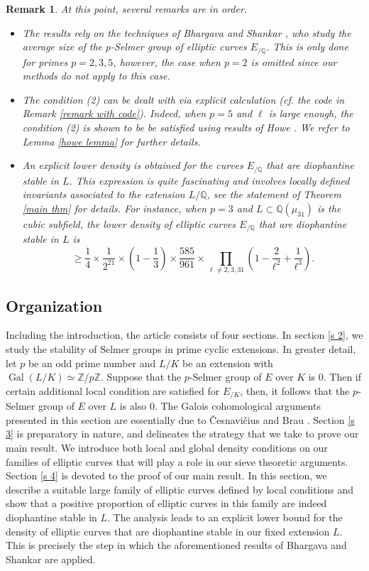 \documentclass[12pt]{amsart}
\newtheorem{remark}[theorem]{Remark}
\newcommand{\Z}{\mathbb{Z}}
\newcommand{\Q}{\mathbb{Q}}
\newcommand{\op}[1]{\operatorname{#1}}
\numberwithin{equation}{section}
\begin{document}
\begin{remark}
    At this point, several remarks are in order.
    \begin{itemize}
        \item The results rely on the techniques of Bhargava and Shankar \cite{BhargavaShankarbinary, bhargavashankar15, bhargavashankar5}, who study the average size of the $p$-Selmer group of elliptic curves $E_{/\Q}$. This is only done for primes $p=2, 3, 5$, however, the case when $p=2$ is omitted since our methods do not apply to this case. 
        \item The condition (2) can be dealt with via explicit calculation (cf. the code in Remark \ref{remark with code}). Indeed, when $p=5$ and $\ell$ is large enough, the condition (2) is shown to be be satisfied using results of Howe \cite{Howe}. We refer to Lemma \ref{howe lemma} for further details. 
        \item An explicit lower density is obtained for the curves $E_{/\Q}$ that are diophantine stable in $L$. This expression is quite fascinating and involves locally defined invariants associated to the extension $L/\Q$, see the statement of Theorem \ref{main thm} for details. For instance, when $p=3$ and $L\subset \Q(\mu_{31})$ is the cubic subfield, the lower density of elliptic curves $E_{/\Q}$ that are diophantine stable in $L$ is 
\[\geq \frac{1}{4} \times \frac{1}{2^{21}}\times \left(1-\frac{1}{3}\right)\times \frac{585}{961}\times \prod_{\ell\neq 2,3,31} \left(1-\frac{2}{\ell^2}+\frac{1}{\ell^3}\right).\]
    \end{itemize}
\end{remark}

\subsection{Organization}
\par Including the introduction, the article consists of four sections. In section \ref{s 2}, we study the stability of Selmer groups in prime cyclic extensions. In greater detail, let $p$ be an odd prime number and $L/K$ be an extension with $\op{Gal}(L/K)\simeq \Z/p\Z$. Suppose that the $p$-Selmer group of $E$ over $K$ is $0$. Then if certain additional local condition are satisfied for $E_{/K}$, then, it follows that the $p$-Selmer group of $E$ over $L$ is also $0$. The Galois cohomological arguments presented in this section are essentially due to \v{C}esnavi\v{c}ius \cite{navicius} and Brau \cite{brau2014selmer}. Section \ref{s 3} is preparatory in nature, and delineates the strategy that we take to prove our main result. We introduce both local and global density conditions on our families of elliptic curves that will play a role in our sieve theoretic arguments. Section \ref{s 4} is devoted to the proof of our main result. In this section, we describe a suitable large family of elliptic curves defined by local conditions and show that a positive proportion of elliptic curves in this family are indeed diophantine stable in $L$. The analysis leads to an explicit lower bound for the density of elliptic curves that are diophantine stable in our fixed extension $L$. This is precisely the step in which the aforementioned results of Bhargava and Shankar are applied.
\end{document}
